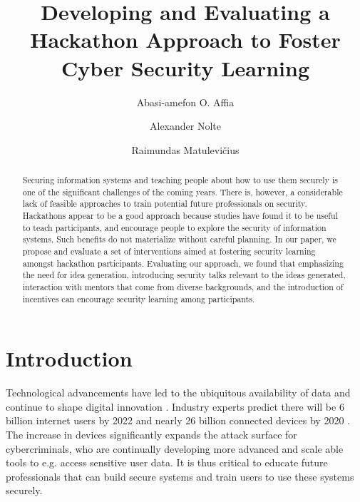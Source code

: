 \documentclass[runningheads]{llncs}
\begin{document}
%
\title{Developing and Evaluating a Hackathon Approach to Foster Cyber Security Learning}
%
%

\author{Abasi-amefon O. Affia \and Alexander Nolte \and Raimundas Matulevi\v{c}ius}

%
\authorrunning{}
%
\maketitle              %
%
\begin{abstract}
Securing information systems and teaching people about how to use them securely is one of the significant challenges of the coming years. There is, however, a considerable lack of feasible approaches to train potential future professionals on security. Hackathons appear to be a good approach because studies have found it to be useful to teach participants, and encourage people to explore the security of information systems. Such benefits do not materialize without careful planning. In our paper, we propose and evaluate a set of interventions aimed at fostering security learning amongst hackathon participants.
Evaluating our approach, we found that emphasizing the need for idea generation, introducing security talks relevant to the ideas generated, interaction with mentors that come from diverse backgrounds, and the introduction of incentives can encourage security learning among participants.
\end{abstract}
%
%

\section{Introduction}
Technological advancements have led to the ubiquitous availability of data and continue to shape digital innovation \cite{davenport2013analytics}. 
Industry experts predict there will be 6 billion internet users by 2022 \cite{cybersecventures2019} and nearly 26 billion connected devices by 2020 \cite{hung2017gartner}. The increase in devices significantly expands the attack surface for cybercriminals, who are continually developing more advanced and scale able tools to e.g. access sensitive user data. 
It is thus critical to educate future professionals that can build secure systems and train users to use these systems securely.
\end{document}
